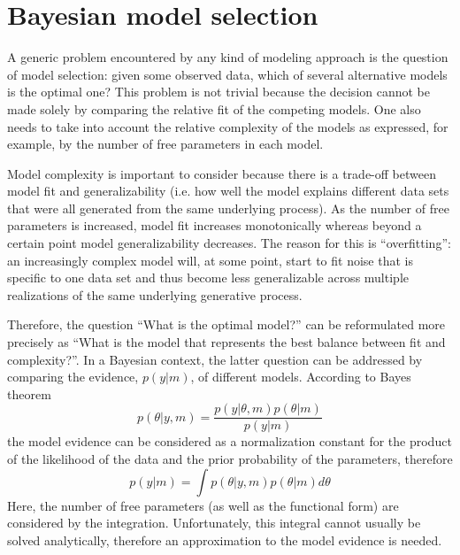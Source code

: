 \section{Bayesian model selection \label{mc}}

A generic problem encountered by any kind of modeling approach is the question of model selection:  given some observed data, which of several alternative models is the optimal one?  This problem is not trivial because the decision cannot be made solely by comparing the relative fit of the competing models.  One also needs to take into account the relative complexity of the models as expressed, for example, by the number of free parameters in each model.  

Model complexity is important to consider because there is a trade-off between model fit and generalizability (i.e. how well the model explains different data sets that were all generated from the same underlying process).  As the number of free parameters is increased, model fit increases monotonically whereas beyond a certain point model generalizability decreases.  The reason for this is ``overfitting'':  an increasingly complex model will, at some point, start to fit noise that is specific to one data set and thus become less generalizable across multiple realizations of the same underlying generative process.

    Therefore, the question ``What is the optimal model?'' can be reformulated more precisely as ``What is the model that represents the best balance between fit and complexity?''. In a Bayesian context, the latter question can be addressed by comparing the evidence, $p(y|m)$, of different models. According to Bayes theorem
\begin{equation}
p(\theta|y,m) = \frac{p(y|\theta,m)p(\theta|m)}{p(y|m)}
\end{equation}
the model evidence can be considered as a normalization constant for the product of the likelihood of the data and the prior probability of the parameters, therefore
\begin{equation}
p(y|m) = \int p(\theta|y,m) p(\theta|m) d\theta
\end{equation}
Here, the number of free parameters (as well as the functional form) are considered by the integration.  Unfortunately, this integral cannot usually be solved analytically, therefore an approximation to the model evidence is needed.

